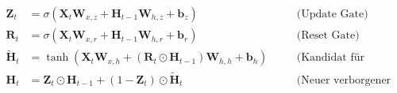 \begin{align}
    \mathbf{Z}_t &= \sigma(\mathbf{X}_t \mathbf{W}_{x,z}  + \mathbf{H}_{t-1} \mathbf{W}_{h,z} + \mathbf{b}_z) \quad &&\text{(Update Gate)} \\
    \mathbf{R}_t &= \sigma(\mathbf{X}_t \mathbf{W}_{x,r} + \mathbf{H}_{t-1} \mathbf{W}_{h,r} + \mathbf{b}_r) \quad &&\text{(Reset Gate)} \\
    \tilde{\mathbf{H}}_t &= \tanh(\mathbf{X}_t \mathbf{W}_{x,h} + (\mathbf{R}_t \odot \mathbf{H}_{t-1}) \mathbf{W}_{h,h} + \mathbf{b}_h) \quad &&\text{(Kandidat für verborgenen Zustand)} \\
    \mathbf{H}_t &= \mathbf{Z}_t \odot \mathbf{H}_{t-1} + (1 - \mathbf{Z}_t) \odot \tilde{\mathbf{H}}_t \quad &&\text{(Neuer verborgener Zustand)}
\end{align}
